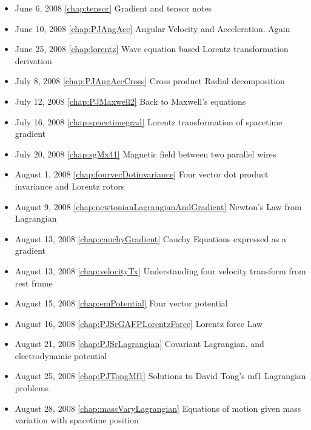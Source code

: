 \begin{itemize}
\item June 6, 2008 \ref{chap:tensor} Gradient and tensor notes

\item June 10, 2008 \ref{chap:PJAngAcc} Angular Velocity and Acceleration.  Again

\item June 25, 2008 \ref{chap:lorentz} Wave equation based Lorentz transformation derivation

\item July 8, 2008 \ref{chap:PJAngAccCross} Cross product Radial decomposition

\item July 12, 2008 \ref{chap:PJMaxwell2} Back to Maxwell's equations

\item July 16, 2008 \ref{chap:spacetimegrad} Lorentz transformation of spacetime gradient

\item July 20, 2008 \ref{chap:sgMx41} Magnetic field between two parallel wires

\item August 1, 2008 \ref{chap:fourvecDotinvariance} Four vector dot product invariance and Lorentz rotors

\item August 9, 2008 \ref{chap:newtonianLagrangianAndGradient} Newton's Law from Lagrangian

\item August 13, 2008 \ref{chap:cauchyGradient} Cauchy Equations expressed as a gradient

\item August 13, 2008 \ref{chap:velocityTx} Understanding four velocity transform from rest frame

\item August 15, 2008 \ref{chap:emPotential} Four vector potential

\item August 16, 2008 \ref{chap:PJSrGAFPLorentzForce} Lorentz force Law

\item August 21, 2008 \ref{chap:PJSrLagrangian} Covariant Lagrangian, and electrodynamic potential

\item August 25, 2008 \ref{chap:PJTongMf1} Solutions to David Tong's mf1 Lagrangian problems

\item August 28, 2008 \ref{chap:massVaryLagrangian} Equations of motion given mass variation with spacetime position


\end{itemize}
